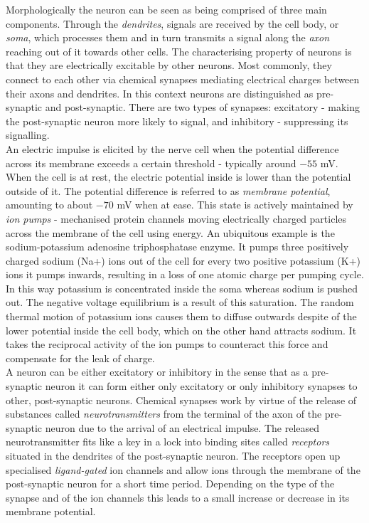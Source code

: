 \documentclass[12pt]{extarticle}
\begin{document}
\noindent
Morphologically the neuron can be seen as being comprised of three
main components. Through the \textit{dendrites}, signals are received
by the cell body, or \textit{soma}, which processes them and in turn
transmits a signal along the \textit{axon} reaching out of it towards
other cells. The characterising property of neurons is that they are
electrically excitable by other neurons. Most commonly, they connect
to each other via chemical synapses mediating electrical charges
between their axons and dendrites. In this context neurons are
distinguished as pre-synaptic and post-synaptic. There are two types
of synapses: excitatory - making the post-synaptic neuron more likely
to signal, and inhibitory - suppressing its signalling.\\

\noindent
An electric impulse is elicited by the nerve cell when the potential
difference across its membrane exceeds a certain threshold - typically
around $-55$ mV. When the cell is at rest, the electric potential
inside is lower than the potential outside of it. The potential
difference is referred to as \textit{membrane potential}, amounting to
about $-70$ mV when at ease. This state is actively maintained by
\textit{ion pumps} - mechanised protein channels moving electrically
charged particles across the membrane of the cell using energy. An
ubiquitous example is the sodium-potassium adenosine triphosphatase
enzyme. It pumps three positively charged sodium (Na+) ions out of the
cell for every two positive potassium (K+) ions it pumps inwards,
resulting in a loss of one atomic charge per pumping cycle. In this
way potassium is concentrated inside the soma whereas sodium is pushed
out. The negative voltage equilibrium is a result of this
saturation. The random thermal motion of potassium ions causes them to
diffuse outwards despite of the lower potential inside the cell body,
which on the other hand attracts sodium. It takes the reciprocal
activity of the ion pumps to counteract this force and compensate for
the leak of charge.\\

\noindent
A neuron can be either excitatory or inhibitory in the sense that as a
pre-synaptic neuron it can form either only excitatory or only
inhibitory synapses to other, post-synaptic neurons. Chemical synapses
work by virtue of the release of substances called
\textit{neurotransmitters} from the terminal of the axon of the
pre-synaptic neuron due to the arrival of an electrical impulse. The
released neurotransmitter fits like a key in a lock into binding sites
called \textit{receptors} situated in the dendrites of the
post-synaptic neuron. The receptors open up specialised
\textit{ligand-gated} ion channels and allow ions through the membrane
of the post-synaptic neuron for a short time period. Depending on the
type of the synapse and of the ion channels this leads to a small
increase or decrease in its membrane potential.\\
\end{document}
